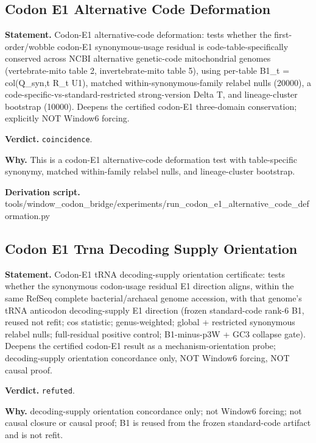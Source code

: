 \subsection{Codon E1 Alternative Code Deformation}\label{sec:bridge-codon-e1-alternative-code-deformation}
\textbf{Statement.} Codon-E1 alternative-code deformation: tests whether the first-order/wobble codon-E1
synonymous-usage residual is code-table-specifically conserved across NCBI alternative genetic-code
mitochondrial genomes (vertebrate-mito table 2, invertebrate-mito table 5), using per-table B1\_t =
col(Q\_syn,t R\_t U1), matched within-synonymous-family relabel nulls (20000), a
code-specific-vs-standard-restricted strong-version Delta T, and lineage-cluster bootstrap (10000).
Deepens the certified codon-E1 three-domain conservation; explicitly NOT Window6 forcing.

\textbf{Verdict.} \texttt{coincidence}.

\textbf{Why.} This is a codon-E1 alternative-code deformation test with table-specific synonymy, matched
within-family relabel nulls, and lineage-cluster bootstrap.

\textbf{Derivation script.} tools/window\_codon\_bridge/experiments/run\_codon\_e1\_alternative\_code\_deformation.py

\subsection{Codon E1 Trna Decoding Supply Orientation}\label{sec:bridge-codon-e1-trna-decoding-supply-orientation}
\textbf{Statement.} Codon-E1 tRNA decoding-supply orientation certificate: tests whether the synonymous codon-usage
residual E1 direction aligns, within the same RefSeq complete bacterial/archaeal genome accession,
with that genome's tRNA anticodon decoding-supply E1 direction (frozen standard-code rank-6 B1,
reused not refit; cos statistic; genus-weighted; global + restricted synonymous relabel nulls;
full-residual positive control; B1-minus-p3W + GC3 collapse gate). Deepens the certified codon-E1
result as a mechanism-orientation probe; decoding-supply orientation concordance only, NOT Window6
forcing, NOT causal proof.

\textbf{Verdict.} \texttt{refuted}.

\textbf{Why.} decoding-supply orientation concordance only; not Window6 forcing; not causal closure or causal
proof; B1 is reused from the frozen standard-code artifact and is not refit.

